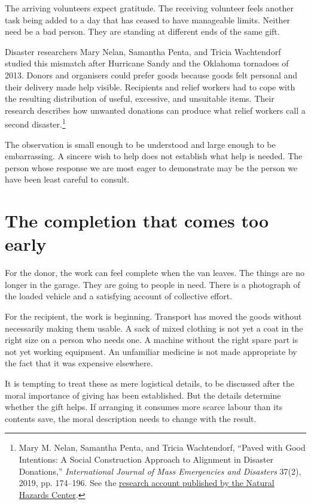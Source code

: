 \documentclass[12pt,a4paper]{book}
\begin{document}
The arriving volunteers expect gratitude. The receiving volunteer feels another task being added to a day that has ceased to have manageable limits. Neither need be a bad person. They are standing at different ends of the same gift.

Disaster researchers Mary Nelan, Samantha Penta, and Tricia Wachtendorf studied this mismatch after Hurricane Sandy and the Oklahoma tornadoes of 2013. Donors and organisers could prefer goods because goods felt personal and their delivery made help visible. Recipients and relief workers had to cope with the resulting distribution of useful, excessive, and unsuitable items. Their research describes how unwanted donations can produce what relief workers call a second disaster.\footnote{Mary M. Nelan, Samantha Penta, and Tricia Wachtendorf, ``Paved with Good Intentions: A Social Construction Approach to Alignment in Disaster Donations,'' \emph{International Journal of Mass Emergencies and Disasters} 37(2), 2019, pp. 174--196. See the \href{https://hazards.colorado.edu/research-counts/the-disaster-cycle/avoiding-the-second-disaster-of-unwanted-donations}{research account published by the Natural Hazards Center}.}

The observation is small enough to be understood and large enough to be embarrassing. A sincere wish to help does not establish what help is needed. The person whose response we are most eager to demonstrate may be the person we have been least careful to consult.

\section*{The completion that comes too early}

For the donor, the work can feel complete when the van leaves. The things are no longer in the garage. They are going to people in need. There is a photograph of the loaded vehicle and a satisfying account of collective effort.

For the recipient, the work is beginning. Transport has moved the goods without necessarily making them usable. A sack of mixed clothing is not yet a coat in the right size on a person who needs one. A machine without the right spare part is not yet working equipment. An unfamiliar medicine is not made appropriate by the fact that it was expensive elsewhere.

It is tempting to treat these as mere logistical details, to be discussed after the moral importance of giving has been established. But the details determine whether the gift helps. If arranging it consumes more scarce labour than its contents save, the moral description needs to change with the result.
\end{document}
